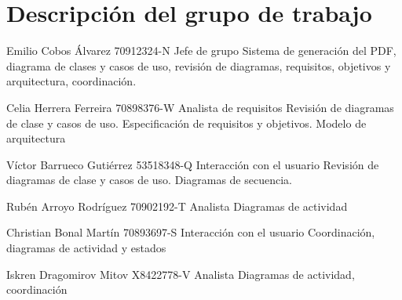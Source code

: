 \section{Descripción del grupo de trabajo}

\staff
{Emilio Cobos Álvarez}
{70912324-N}
{Jefe de grupo}
{Sistema de generación del PDF, diagrama de clases y casos de uso, revisión de
diagramas, requisitos, objetivos y arquitectura, coordinación.}

\staff
{Celia Herrera Ferreira}
{70898376-W}
{Analista de requisitos}
{Revisión de diagramas de clase y casos de uso. Especificación de requisitos y objetivos. Modelo de arquitectura}

\staff
{Víctor Barrueco Gutiérrez}
{53518348-Q}
{Interacción con el usuario}
{Revisión de diagramas de clase y casos de uso. Diagramas de secuencia.}

\staff
{Rubén Arroyo Rodríguez}
{70902192-T}
{Analista}
{Diagramas de actividad}

\staff
{Christian Bonal Martín}
{70893697-S}
{Interacción con el usuario}
{Coordinación, diagramas de actividad y estados}

\staff
{Iskren Dragomirov Mitov}
{X8422778-V}
{Analista}
{Diagramas de actividad, coordinación}

